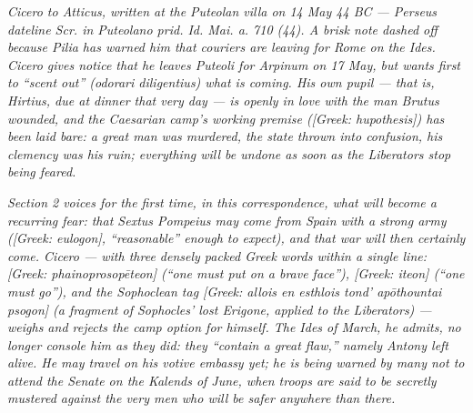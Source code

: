 
\textit{Cicero to Atticus, written at the Puteolan villa on 14
May 44 BC --- Perseus dateline \textit{Scr. in Puteolano prid.
Id. Mai. a. 710 (44)}. A brisk note dashed off because Pilia
has warned him that couriers are leaving for Rome on the Ides.
Cicero gives notice that he leaves Puteoli for Arpinum on 17
May, but wants first to ``scent out'' (\textit{odorari
diligentius}) what is coming. His own pupil --- that is,
Hirtius, due at dinner that very day --- is openly in love
with the man Brutus wounded, and the Caesarian camp's
working premise (\textit{[Greek: hupothesis]}) has been
laid bare: a great man was murdered, the state thrown into
confusion, his clemency was his ruin; everything will be
undone as soon as the Liberators stop being feared.}

\textit{Section 2 voices for the first time, in this
correspondence, what will become a recurring fear: that
Sextus Pompeius may come from Spain with a strong army
(\textit{[Greek: eulogon]}, ``reasonable'' enough to expect),
and that war will then certainly come. Cicero --- with three
densely packed Greek words within a single line: \textit{
[Greek: phainoprosop\=eteon]} (``one must put on a brave
face''), \textit{[Greek: iteon]} (``one must go''), and the
Sophoclean tag \textit{[Greek: allois en esthlois tond'
ap\=othountai psogon]} (a fragment of Sophocles' lost
\textit{Erigone}, applied to the Liberators) --- weighs and
rejects the camp option for himself. The Ides of March, he
admits, no longer console him as they did: they ``contain a
great flaw,'' namely Antony left alive. He may travel on his
votive embassy yet; he is being warned by many not to attend
the Senate on the Kalends of June, when troops are said to be
secretly mustered against the very men who will be safer
anywhere than there.}
